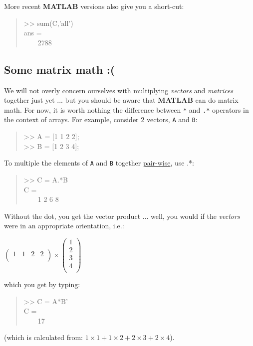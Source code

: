 \documentclass{tufte-book} %
\newenvironment{docspec}{\begin{quotation}\ttfamily\parskip0pt\parindent0pt\ignorespaces}{\end{quotation}}
\begin{document}
More recent \textbf{MATLAB} versions also give you a short-cut:
\begin{docspec}
>> sum(C,'all')\\
ans = \\
\ \ \ \ 2788\\
\end{docspec}


\subsection{Some matrix math :(}

We will not overly concern  ourselves  with multiplying \textit{vectors} and \textit{matrices} together just yet ... but you should be aware that \textbf{MATLAB} can do matrix math. For now, it is worth nothing the difference between \texttt{*} and \texttt{.*} operators in the context of arrays. For example, consider 2 vectors, \texttt{A} and \texttt{B}:

\begin{docspec}
>> A = [1 1 2 2];\\
>> B = [1 2 3 4];
\end{docspec}

To multiple the elements of \texttt{A} and \texttt{B} together \uline{pair-wise}, use .*:

\begin{docspec}
>> C = A.*B
\\
C =\\
\ \ \ \ 1     2     6     8
\end{docspec}

Without the dot, you get the vector product ... well, you would if the \textit{vectors} were in an appropriate orientation, i.e.:

\vspace{1mm}
\(\begin{pmatrix}1 & 1 & 2 & 2 \\
\end{pmatrix}\times\begin{pmatrix}1 \\
2 \\
3 \\
4 \\
\end{pmatrix}\)
\vspace{1mm}

\noindent which you get by typing:

\begin{docspec}
>> C = A*B'
\\
C =\\
\ \ \ \ 17
\end{docspec}
(which is  calculated from: \(1\times1 + 1\times2 + 2\times3 + 2\times4\)).
\end{document}

